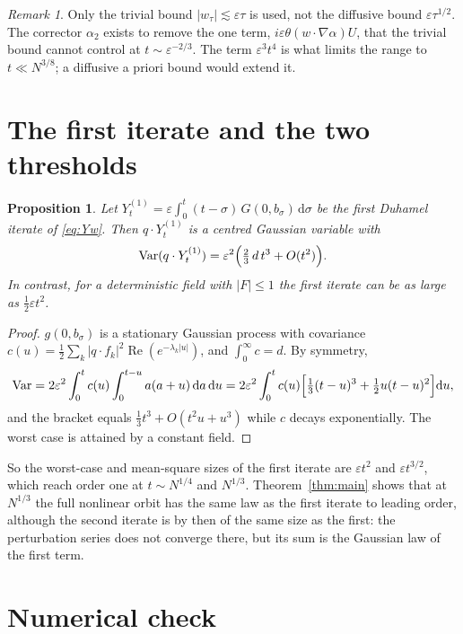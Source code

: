 \documentclass[11pt]{article}
\newcommand{\dd}{\mathrm{d}}
\newcommand{\eps}{\varepsilon}
\renewcommand{\Re}{\operatorname{Re}}
\newtheorem{proposition}[theorem]{Proposition}
\theoremstyle{remark}
\newtheorem{remark}[theorem]{Remark}
\begin{document}
\begin{remark}
Only the trivial bound $|w_\tau|\lesssim\eps\tau$ is used, not the diffusive
bound $\eps\tau^{1/2}$. The corrector $\alpha_2$ exists to remove the one term,
$i\eps\theta(w\cdot\nabla\alpha)U$, that the trivial bound cannot control at
$t\sim\eps^{-2/3}$. The term $\eps^3t^4$ is what limits the range to
$t\ll N^{3/8}$; a diffusive a priori bound would extend it.
\end{remark}

\section{The first iterate and the two thresholds}

\begin{proposition}\label{prop:first}
Let $Y^{(1)}_t = \eps\int_0^t(t-\sigma)\,G(0,b_\sigma)\,\dd\sigma$ be the
first Duhamel iterate of \eqref{eq:Yw}. Then $q\cdot Y^{(1)}_t$ is a centred
Gaussian variable with
\[
  \operatorname{Var}(q\cdot Y^{(1)}_t)
  = \eps^2\Bigl(\tfrac23\,d\,t^3 + O(t^2)\Bigr).
\]
In contrast, for a deterministic field with $|F|\le1$ the first iterate can
be as large as $\tfrac12\eps t^2$.
\end{proposition}

\begin{proof}
$g(0,b_\sigma)$ is a stationary Gaussian process with covariance
$c(u) = \frac12\sum_k|q\cdot f_k|^2\Re(e^{-\lambda_k|u|})$, and
$\int_0^\infty c = d$. By symmetry,
\[
  \operatorname{Var} = 2\eps^2\int_0^t c(u)\int_0^{t-u}a(a+u)\,\dd a\,\dd u
  = 2\eps^2\int_0^t c(u)\Bigl[\tfrac13(t-u)^3 + \tfrac12u(t-u)^2\Bigr]\dd u ,
\]
and the bracket equals $\tfrac13t^3 + O(t^2u + u^3)$ while $c$ decays
exponentially. The worst case is attained by a constant field.
\end{proof}

So the worst-case and mean-square sizes of the first iterate are $\eps t^2$
and $\eps t^{3/2}$, which reach order one at $t\sim N^{1/4}$ and $N^{1/3}$.
Theorem~\ref{thm:main} shows that at $N^{1/3}$ the full nonlinear orbit has
the same law as the first iterate to leading order, although the second
iterate is by then of the same size as the first: the perturbation series
does not converge there, but its sum is the Gaussian law of the first term.

\section{Numerical check}
\end{document}
